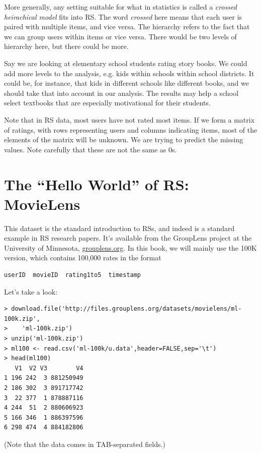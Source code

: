 More generally, any setting suitable for what in statistics is called
a \textit{crossed heirachical model} fits into RS.  The word
\textit{crossed} here means that each user is paired with multiple
items, and vice versa.  The hierarchy refers to the fact that we can
group users within items or vice versa.  There would be two levels of
hierarchy here, but there could be more.  

Say we are looking at elementary school students rating story books.  We
could add more levels to the analysis, e.g. kids within schools within
school districts.  It could be, for instance, that kids in different
schools like different books, and we should take that into account in
our analysis.  The results may help a school select textbooks that are
especially motivational for their students.

Note that in RS data, most users have not rated most items.  If we form
a matrix of ratings, with rows representing users and columns indicating
items, most of the elements of the matrix will be unknown.  We are
trying to predict the missing values.  Note carefully that these are not
the same as 0s.

\section{The ``Hello World'' of RS:  MovieLens}

This dataset is the standard introduction to RSs, and indeed is a
standard example in RS research papers.  It's available from the
GroupLens project at the University of Minnesota, \url{grouplens.org}.
In this book, we will mainly use the 100K version, which contains
100,000 rates in the format

\begin{lstlisting}
userID  movieID  rating1to5  timestamp
\end{lstlisting}

Let's take a look:

\begin{lstlisting}
> download.file('http://files.grouplens.org/datasets/movielens/ml-100k.zip', 
>    'ml-100k.zip') 
> unzip('ml-100k.zip') 
> ml100 <- read.csv('ml-100k/u.data',header=FALSE,sep='\t')
> head(ml100)
   V1  V2 V3        V4
1 196 242  3 881250949
2 186 302  3 891717742
3  22 377  1 878887116
4 244  51  2 880606923
5 166 346  1 886397596
6 298 474  4 884182806
\end{lstlisting}

(Note that the data comes in TAB-separated fields.)

